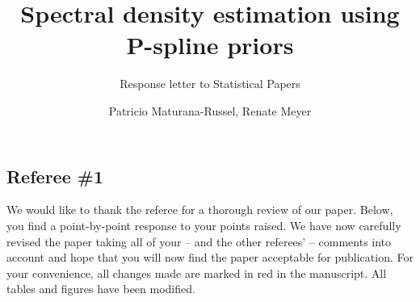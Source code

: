 \documentclass{scrartcl}
\title{Spectral density estimation using P-spline priors}
\subtitle{Response letter to Statistical Papers}
\author{Patricio Maturana-Russel, Renate Meyer}
\newcommand{\response}{}
\begin{document}
\maketitle\thispagestyle{empty}




\subsection*{Referee \#1}

\response{We would like to thank the referee for a thorough review of our paper. Below, you find a point-by-point response to your points raised. We have now carefully revised the paper taking all of your -- and the other referees' -- comments into account and hope that you will now find the paper acceptable for publication. For your convenience, all changes made are marked in red in the manuscript.  All tables and figures have been modified.} 
\end{document}
